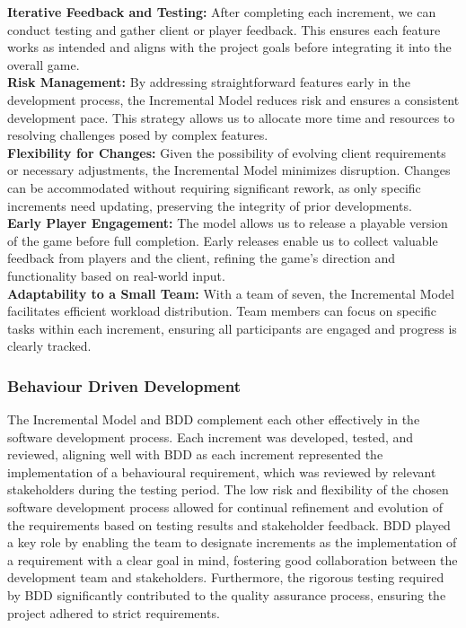 \documentclass[11pt, a4paper]{article}
\begin{document}
\noindent \textbf{Iterative Feedback and Testing:} After completing each increment, we can conduct testing and gather client or player feedback. This ensures each feature works as intended and aligns with the project goals before integrating it into the overall game. \\

\noindent \textbf{Risk Management:} By addressing straightforward features early in the development process, the Incremental Model reduces risk and ensures a consistent development pace. This strategy allows us to allocate more time and resources to resolving challenges posed by complex features. \\

\noindent \textbf{Flexibility for Changes:} Given the possibility of evolving client requirements or necessary adjustments, the Incremental Model minimizes disruption. Changes can be accommodated without requiring significant rework, as only specific increments need updating, preserving the integrity of prior developments. \\

\noindent \textbf{Early Player Engagement:} The model allows us to release a playable version of the game before full completion. Early releases enable us to collect valuable feedback from players and the client, refining the game’s direction and functionality based on real-world input. \\

\noindent \textbf{Adaptability to a Small Team:} With a team of seven, the Incremental Model facilitates efficient workload distribution. Team members can focus on specific tasks within each increment, ensuring all participants are engaged and progress is clearly tracked. \\

\subsubsection{Behaviour Driven Development}

The Incremental Model and BDD complement each other effectively in the software development process. Each increment was developed, tested, and reviewed, aligning well with BDD as each increment represented the implementation of a behavioural requirement, which was reviewed by relevant stakeholders during the testing period. The low risk and flexibility of the chosen software development process allowed for continual refinement and evolution of the requirements based on testing results and stakeholder feedback. BDD played a key role by enabling the team to designate increments as the implementation of a requirement with a clear goal in mind, fostering good collaboration between the development team and stakeholders. Furthermore, the rigorous testing required by BDD significantly contributed to the quality assurance process, ensuring the project adhered to strict requirements.
\end{document}
